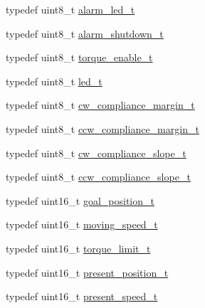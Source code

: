 \begin{DoxyCompactItemize}
\item 
typedef uint8\+\_\+t \hyperlink{structdynamixel_1_1servos_1_1_model_traits_3_01_ax12_w_01_4_1_1_c_t_adfa51dff7cf2e16491d70c83b4ff7fb0}{alarm\+\_\+led\+\_\+t}
\item 
typedef uint8\+\_\+t \hyperlink{structdynamixel_1_1servos_1_1_model_traits_3_01_ax12_w_01_4_1_1_c_t_a0ed5030bdb817286696c24bc53fc28ad}{alarm\+\_\+shutdown\+\_\+t}
\item 
typedef uint8\+\_\+t \hyperlink{structdynamixel_1_1servos_1_1_model_traits_3_01_ax12_w_01_4_1_1_c_t_a6293e686823761bfaca72740e80d744f}{torque\+\_\+enable\+\_\+t}
\item 
typedef uint8\+\_\+t \hyperlink{structdynamixel_1_1servos_1_1_model_traits_3_01_ax12_w_01_4_1_1_c_t_aaad3ecd90143aaed7e83fe80737cdc36}{led\+\_\+t}
\item 
typedef uint8\+\_\+t \hyperlink{structdynamixel_1_1servos_1_1_model_traits_3_01_ax12_w_01_4_1_1_c_t_abfa7d111ad9263106805e4ff7964f614}{cw\+\_\+compliance\+\_\+margin\+\_\+t}
\item 
typedef uint8\+\_\+t \hyperlink{structdynamixel_1_1servos_1_1_model_traits_3_01_ax12_w_01_4_1_1_c_t_af97d6c5ad37cb9afe08b4feadfbecbda}{ccw\+\_\+compliance\+\_\+margin\+\_\+t}
\item 
typedef uint8\+\_\+t \hyperlink{structdynamixel_1_1servos_1_1_model_traits_3_01_ax12_w_01_4_1_1_c_t_ae6e0c7e31e6b29f6c5981859ac81728d}{cw\+\_\+compliance\+\_\+slope\+\_\+t}
\item 
typedef uint8\+\_\+t \hyperlink{structdynamixel_1_1servos_1_1_model_traits_3_01_ax12_w_01_4_1_1_c_t_a58edaed5d4aa276901aecb75ac5ad766}{ccw\+\_\+compliance\+\_\+slope\+\_\+t}
\item 
typedef uint16\+\_\+t \hyperlink{structdynamixel_1_1servos_1_1_model_traits_3_01_ax12_w_01_4_1_1_c_t_af184c96de5ee8689ae808992e8d0b41a}{goal\+\_\+position\+\_\+t}
\item 
typedef uint16\+\_\+t \hyperlink{structdynamixel_1_1servos_1_1_model_traits_3_01_ax12_w_01_4_1_1_c_t_a8a3fc3c13d5a76de89ab7d0591560bc0}{moving\+\_\+speed\+\_\+t}
\item 
typedef uint16\+\_\+t \hyperlink{structdynamixel_1_1servos_1_1_model_traits_3_01_ax12_w_01_4_1_1_c_t_ac27280b65bac2814942a5ccf35718dda}{torque\+\_\+limit\+\_\+t}
\item 
typedef uint16\+\_\+t \hyperlink{structdynamixel_1_1servos_1_1_model_traits_3_01_ax12_w_01_4_1_1_c_t_a34e50228e0f0e767c56d16bdf09005fe}{present\+\_\+position\+\_\+t}
\item 
typedef uint16\+\_\+t \hyperlink{structdynamixel_1_1servos_1_1_model_traits_3_01_ax12_w_01_4_1_1_c_t_a9d723b6d3ba2908a4e9de265595d0d8c}{present\+\_\+speed\+\_\+t}

\end{DoxyCompactItemize}

